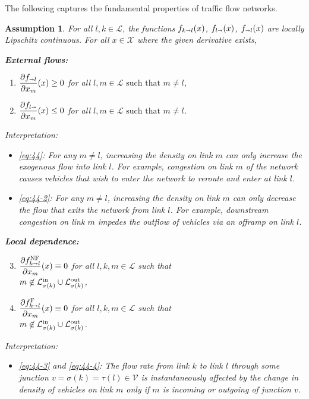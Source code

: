 \documentclass[letterpaper, 10 pt, conference]{ieeeconf}
\newcommand{\sra}{\shortrightarrow}
\newtheorem{assum}{Assumption}
\newcommand{\Verts}{\mathcal{V}}
\newcommand{\Links}{\mathcal{L}}
\newcommand{\Lin}{\mathcal{L}^\textnormal{in}}
\newcommand{\Lout}{\mathcal{L}^\textnormal{out}}
\newcommand{\head}{{\sigma}}
\newcommand{\tail}{{\tau}}
\newcommand{\Dom}{\mathcal{X}}
\begin{document}
The following captures the fundamental properties of traffic flow networks.
\begin{assum}
\label{assum:main}
For all $l,k\in\Links$, the functions $f_{k\sra l}(x)$, $f_{l\sra}(x)$, $f_{\sra l}(x)$ are locally Lipschitz continuous. For all $x\in\Dom$ where the given derivative exists,

\noindent \textbf{External flows:}
  \begin{enumerate}[label={(A\arabic*)},labelindent=*,leftmargin=*]
\item\label{eq:44}
 $\displaystyle\frac{\partial f_{\sra l}}{\partial x_m}(x) \geq 0$ for all $ l,m\in\Links \text{ such that } m\neq l$,\\
\item \label{eq:44-2}   $\displaystyle\frac{\partial f_{l \sra}}{\partial x_m}(x) \leq 0$ for all $ l,m\in\Links \text{ such that } m\neq l$.
  \end{enumerate}
Interpretation:
  \begin{itemize}[leftmargin=*]
\item \ref{eq:44}: For any $m\neq l$, increasing the density on link $m$ can only increase the exogenous flow into link $l$. For example, congestion on link $m$ of the network causes vehicles that wish to enter the network to reroute and enter at link $l$.
\item \ref{eq:44-2}: For any $m\neq l$, increasing the density on link $m$ can only decrease the flow that exits the network from link $l$. For example, downstream congestion on link $m$ impedes the outflow of vehicles via an offramp on link $l$. 
  \end{itemize}
\noindent \textbf{Local dependence:}
\begin{enumerate}[label={(A\arabic*)},labelindent=*,leftmargin=*]
\setcounter{enumi}{2}
\item \label{eq:44-3}  $\displaystyle\frac{\partial \fNF_{k \sra l}}{\partial x_m}(x) \equiv 0$ for all $l,k,m\in\Links$ such that \\$m\not\in\Lin_{\head(k)}\cup\Lout_{\head(k)}$,
\item \label{eq:44-4}  $\displaystyle\frac{\partial \fF_{k \sra l}}{\partial x_m}(x) \equiv 0$ for all $l,k,m\in\Links$ such that  \\ $m\not\in\Lin_{\head(k)}\cup\Lout_{\head(k)}$.
  \end{enumerate}
Interpretation:
\begin{itemize}[leftmargin=*]
\item \ref{eq:44-3} and \ref{eq:44-4}: The flow rate from link $k$ to link $l$ through some junction $v=\head(k)=\tail(l)\in\Verts$ is instantaneously affected by the change in density of vehicles on link $m$ only if $m$ is incoming or outgoing of junction $v$.
\end{itemize}


\end{assum}
\end{document}
